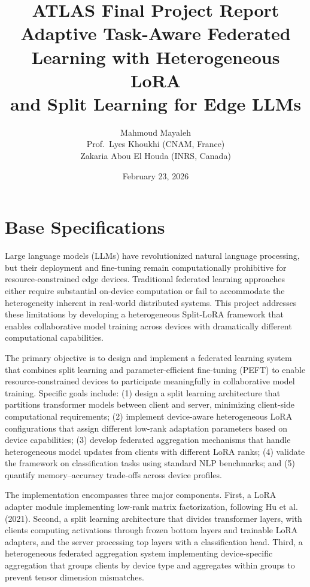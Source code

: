 \documentclass[11pt,a4paper]{article}
\title{ATLAS Final Project Report\\
Adaptive Task-Aware Federated Learning with Heterogeneous LoRA\\
and Split Learning for Edge LLMs}
\author{%
Mahmoud Mayaleh\\[6pt]
{\small Prof.\ Lyes Khoukhi (CNAM, France)}\\
{\small Zakaria Abou El Houda (INRS, Canada)}
}
\date{February 23, 2026}
\begin{document}
\maketitle

\tableofcontents
\newpage


\section{Base Specifications}

Large language models (LLMs) have revolutionized natural language processing, but their deployment and fine-tuning remain computationally prohibitive for resource-constrained edge devices. Traditional federated learning approaches either require substantial on-device computation or fail to accommodate the heterogeneity inherent in real-world distributed systems. This project addresses these limitations by developing a heterogeneous Split-LoRA framework that enables collaborative model training across devices with dramatically different computational capabilities.

The primary objective is to design and implement a federated learning system that combines split learning and parameter-efficient fine-tuning (PEFT) to enable resource-constrained devices to participate meaningfully in collaborative model training. Specific goals include: (1) design a split learning architecture that partitions transformer models between client and server, minimizing client-side computational requirements; (2) implement device-aware heterogeneous LoRA configurations that assign different low-rank adaptation parameters based on device capabilities; (3) develop federated aggregation mechanisms that handle heterogeneous model updates from clients with different LoRA ranks; (4) validate the framework on classification tasks using standard NLP benchmarks; and (5) quantify memory--accuracy trade-offs across device profiles.

The implementation encompasses three major components. First, a LoRA adapter module implementing low-rank matrix factorization, following Hu et al. (2021). Second, a split learning architecture that divides transformer layers, with clients computing activations through frozen bottom layers and trainable LoRA adapters, and the server processing top layers with a classification head. Third, a heterogeneous federated aggregation system implementing device-specific aggregation that groups clients by device type and aggregates within groups to prevent tensor dimension mismatches.
\end{document}
